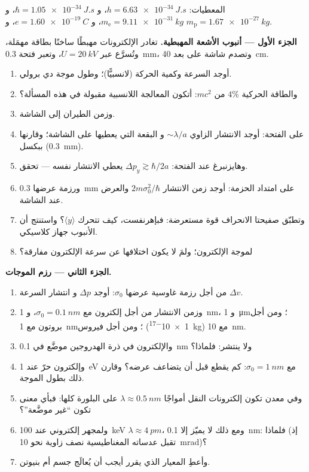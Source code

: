 \begin{problem}\label{pb:b2:schrodinger-wave-functions:1}
المعطيات: $h = \qty{6.63e-34}{J.s}$، و $\hbar = \qty{1.05e-34}{J.s}$، و $m_{\text{e}} =
\qty{9.11e-31}{kg}$، و $e = \qty{1.60e-19}{C}$، و $m_{\text{p}} = \qty{1.67e-27}{kg}$.

\textbf{الجزء الأول --- أنبوب الأشعة المهبطية.}
تغادر الإلكترونات مهبطًا ساخنًا بطاقة مهمَلة، وتُسرَّع
عبر $U = \qty{20}{kV}$، وتعبر فتحة \qty{0.3}{mm}، وتصدم
شاشة على بعد \qty{40}{cm}.
\begin{enumerate}
  \item أوجد السرعة وكمية الحركة (لانسبيًّا)؛ وطول موجة دي برولي.
  \item والطاقة الحركية $4\%$ من $mc^2$: أتكون المعالجة اللانسبية
        مقبولة في هذه المسألة؟
  \item وزمن الطيران إلى الشاشة.
  \item {} على الفتحة: أوجد الانتشار الزاوي $\sim\lambda/a$ و
        البقعة التي يعطيها على الشاشة؛ وقارنها ببكسل
        (\qty{0.3}{mm}).
  \item وهايزنبرغ عند الفتحة: $\Delta p_y \gtrsim \hbar/2a$ يعطي
        الانتشار نفسه --- تحقق.
  \item ورزمة عرضها \qty{0.3}{mm} على امتداد الحزمة: أوجد زمن الانتشار
        $2m\sigma_0^2/\hbar$ والعرض عند الشاشة.
  \item وتطبّق صفيحتا الانحراف قوة مستعرضة: فبإهرنفست، كيف
        تتحرك $\langle y\rangle$؟ واستنتج أن الأنبوب جهاز
        كلاسيكي.
  \item {} لموجة الإلكترون؛ ولمَ لا يكون اختلافها عن
        سرعة الإلكترون مفارقة؟
\end{enumerate}

\textbf{الجزء الثاني --- رزم الموجات.}
\begin{enumerate}[resume]
  \item من أجل رزمة غاوسية عرضها $\sigma_0$: أوجد $\Delta p$ و
        انتشار السرعة $\Delta v$.
  \item وزمن الانتشار من أجل إلكترون مع $\sigma_0 = \qty{0.1}{nm}$،
        و \qty{1}{nm}، و \qty{1}{\micro m}؛ ومن أجل بروتون مع \qty{1}{nm}؛ ومن أجل
        فيروس (\qty{1e-17}{kg}) مع \qty{10}{nm}.
  \item والإلكترون في ذرة الهدروجين موضَّع في \qty{0.1}{nm}
        ولا ينتشر: فلماذا؟
  \item وإلكترون حرّ عند \qty{1}{eV} مع $\sigma_0 = \qty{1}{nm}$: كم يقطع
        قبل أن يتضاعف عرضه؟ وقارن ذلك بطول
        الموجة.
  \item وفي معدن تكون إلكترونات النقل أمواجًا $\lambda \approx
        \qty{0.5}{nm}$ على البلورة كلها: فبأي معنى تكون
        ``غير موضَّعة''؟
  \item ولمجهر إلكتروني عند \qty{100}{keV} $\lambda \approx
        \qty{4}{pm}$، ومع ذلك لا يميّز إلا \qty{0.1}{nm}: فلماذا (إذ تقبل عدساته
        المغناطيسية نصف زاوية نحو \qty{10}{mrad})؟
  \item وأعطِ المعيار الذي يقرر أيجب أن يُعالَج جسم
         أم بنيوتن.
\end{enumerate}


\end{problem}
